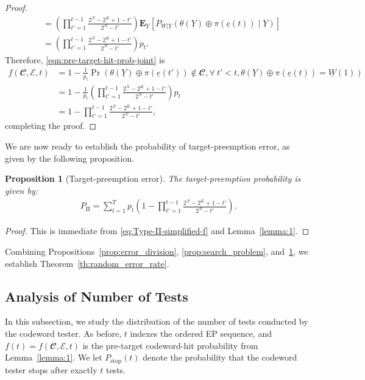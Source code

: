 \documentclass[letterpaper,draftclsnofoot,onecolumn]{IEEEtran}
\newtheorem{proposition}{Proposition}
\begin{document}
\begin{proof}
\begin{align}
        &= \left(\prod_{t'=1}^{t-1}\frac{2^N-2^K+1-t'}{2^N-t'} \right) \mathbf{E}_{\underline{Y}}\left[P_{\underline{W}|\underline{Y}}(\theta(\underline{Y})\oplus \pi(\underline{e}(t)) \mid \underline{Y})\right] \\
        &= \left(\prod_{t'=1}^{t-1}\frac{2^N-2^K+1-t'}{2^N-t'} \right) p_{t}.
    \end{align}
    Therefore, \eqref{eqn:pre-target-hit-prob-joint} is
    \begin{align}
        f(\mathbfcal{C},\mathcal{E},t) &= 1 - \frac{1}{p_{t}} \Pr(\theta(\underline{Y})\oplus \pi(\underline{e}(t'))\notin \mathbfcal{C},\forall\ t'< t, \theta(\underline{Y})\oplus \pi(\underline{e}(t))=\underline{W}(1)) \\
        &= 1 - \frac{1}{p_{t}} \left(\prod_{t'=1}^{t-1}\frac{2^N-2^K+1-t'}{2^N-t'} \right) p_{t} \\
        &= 1 - \prod_{t'=1}^{t-1}\frac{2^N-2^K+1-t'}{2^N-t'},
    \end{align}
    completing the proof.    
\end{proof}

We are now ready to establish the probability of target-preemption error, as given by the following proposition.

\begin{proposition}[Target-preemption error]\label{prop:random_pre_target_hit}
    The target-preemption probability is given by:
    \begin{align}
        P_{\mathrm{II}} = \sum_{t=1}^{T} p_{t} \left(1 - \prod_{t' = 1}^{t-1} \frac{2^N-2^K+1-t'}{2^N-t'}\right). \label{eq:second_err}
    \end{align}
\end{proposition}
\begin{proof}
This is immediate from \eqref{eq:Type-II-simplified-f} and Lemma~\ref{lemma:1}.
\end{proof}

Combining Propositions~\ref{prop:error_division}, \ref{prop:search_problem}, and~\ref{prop:random_pre_target_hit}, we establish Theorem~\ref{th:random_error_rate}.

\subsection{Analysis of Number of Tests}\label{SubSec:random_requests_number}

In this subsection, we study the distribution of the number of tests conducted by the codeword tester. As before, $t$ indexes the ordered EP sequence, and $f(t)=f(\mathbfcal{C}, \mathcal{E}, t)$ is the pre-target codeword-hit probability from Lemma~\ref{lemma:1}. We let $P_{\text{stop}}(t)$ denote the probability that the codeword tester stops after exactly $t$ tests.
\end{document}
